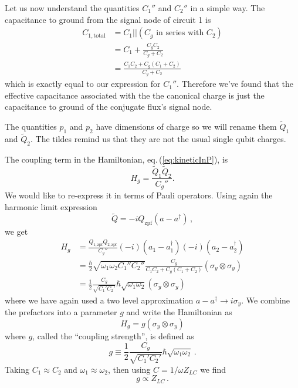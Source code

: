 Let us now understand the quantities $C_1''$ and $C_2''$ in a simple way.
The capacitance to ground from the signal node of circuit 1 is
  \begin{align*}
  C_{1,\textrm{total}}
    &= C_1||(C_g \textrm{ in series with } C_2) \\
    &= C_1 + \frac{C_g C_2}{C_g+C_2} \\
    &= \frac{C_1 C_2 + C_g(C_1+C_2)}{C_g+C_2}
\end{align*}
which is exactly equal to our expression for $C_1''$.
Therefore we've found that the effective capacitance associated with the the canonical charge is just the capacitance to ground of the conjugate flux's signal node.

The quantities $p_1$ and $p_2$ have dimensions of charge so we will rename them $\tilde{Q}_1$ and $\tilde{Q}_2$.
The tildes remind us that they are not the usual single qubit charges.

The coupling term in the Hamiltonian, eq.\,(\ref{eq:kineticInP}), is \begin{equation}
H_g = \frac{ \tilde{Q}_1 \tilde{Q}_2} {C_g''}. \label{eq:sec:coupling:H_g} \end{equation}
We would like to re-express it in terms of Pauli operators.
Using again the harmonic limit expression
\begin{equation}
  \tilde{Q} = -i Q_{\textrm{zpf}} (a - a^{\dagger}) \, ,
\end{equation}
we get
\begin{align*}
H_g
  &= \frac{Q_{1,\textrm{zpf}}Q_{2,\textrm{zpf}}}{C_g''}(-i)(a_1-a_1^{\dagger})(-i)(a_2-a_2^{\dagger}) \\
  &= \frac{\hbar}{2}\sqrt{\omega_1\omega_2 C_1'' C_2''}\frac{C_g}{C_1C_2 + C_g(C_1+C_2)}(\sigma_y \otimes \sigma_y) \\
  &= \frac{1}{2}\frac{C_g}{\sqrt{C_1' C_2'}} \hbar\sqrt{\omega_1\omega_2} (\sigma_y \otimes \sigma_y)
\end{align*}
where we have again used a two level approximation \mbox{$a - a^\dagger \rightarrow i \sigma_y$}.
We combine the prefactors into a parameter $g$ and write the Hamiltonian as \begin{equation}
H_g = g \left( \sigma_y \otimes \sigma_y \right) \end{equation}
where $g$, called the ``coupling strength'', is defined as \begin{equation}
g \equiv \frac{1}{2} \frac{C_g}{\sqrt{C_1' C_2'}} \hbar\sqrt{\omega_1\omega_2} \, . \end{equation}
Taking $C_1 \approx C_2$ and $\omega_1 \approx \omega_2$, then using $C = 1 / \omega Z_{LC}$ we find
\begin{equation}
g \propto Z_{LC} \, .
\end{equation}


